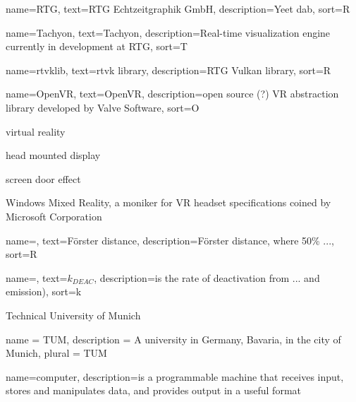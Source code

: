 
{
  name=RTG,
  text=RTG Echtzeitgraphik GmbH,
  description={Yeet dab}, 
  sort=R
}

{
  name=Tachyon,
  text=Tachyon,
  description={Real-time visualization engine currently in development at \gls{RTG}}, 
  sort=T
}

{
  name=rtvklib,
  text=rtvk library,
  description={\gls{RTG} Vulkan library}, 
  sort=R
}

{
  name=OpenVR,
  text=OpenVR,
  description={open source (?) \gls{VR} abstraction library developed by Valve Software}, 
  sort=O
}

{virtual reality}

{head mounted display}

{screen door effect}

{Windows Mixed Reality, a moniker for \gls{VR} headset specifications coined by Microsoft Corporation}







{
  name=,
  text=F\"{o}rster distance,
  description={F\"{o}rster distance, where 50\% ...}, 
  sort=R
}

{
  name=,
  text=$k_{DEAC}$, 
  description={is the rate of deactivation from ... and emission)}, 
  sort=k
}

{Technical University of Munich}

{
  name = TUM,
  description = {A university in Germany, Bavaria, in the city of Munich},
  plural = TUM
}

{
  name=computer,
  description={is a programmable machine that receives input,
               stores and manipulates data, and provides
               output in a useful format}
}